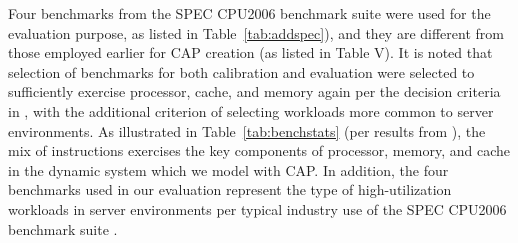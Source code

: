 \documentclass[prodmode,acmtaco,pdftex]{acmsmall}
\begin{document}
Four benchmarks from the SPEC CPU2006 benchmark suite were used for the
evaluation purpose, as listed in Table~\ref{tab:addspec}), and they are
different from those employed earlier for CAP creation (as listed in
Table V). It is noted that selection of benchmarks for both calibration
and evaluation were selected to sufficiently exercise processor, cache,
and memory again per the decision criteria in \cite{Phansalkar2007},
with the additional criterion of selecting workloads more common to
server environments. As illustrated in Table~\ref{tab:benchstats}
(per results from \cite{Phansalkar2007}), the mix of instructions
exercises the key components of processor, memory, and cache in the
dynamic system which we model with CAP. In addition, the four
benchmarks used in our evaluation represent the type of high-utilization
workloads in server environments per typical industry use of the SPEC
CPU2006 benchmark suite \cite{Cisco2010}.
\begin{table}%
\end{table}
\end{document}
